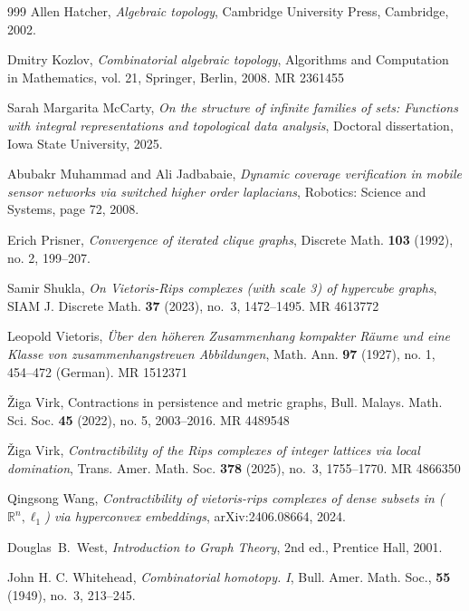 \documentclass{amsart}
\theoremstyle{definition}
\theoremstyle{remark}
\numberwithin{equation}{section}
\begin{document}
{\begin{thebibliography}{999}
Allen Hatcher, {\em Algebraic topology}, Cambridge University Press, Cambridge, 2002.


Dmitry Kozlov, {\em Combinatorial algebraic topology}, Algorithms and Computation in Mathematics, vol. 21, Springer, Berlin, 2008. MR 2361455

Sarah Margarita McCarty, {\em On the structure of infinite families of sets: Functions with integral representations and topological data analysis}, Doctoral dissertation, Iowa State
University, 2025.






Abubakr Muhammad and Ali Jadbabaie, {\em Dynamic coverage verification in mobile sensor networks via switched higher order laplacians}, Robotics: Science and Systems,
page 72, 2008.



Erich Prisner, {\em Convergence of iterated clique graphs}, Discrete Math. {\bf 103} (1992), no. 2, 199--207.




Samir Shukla, {\em On Vietoris-Rips complexes (with scale 3) of hypercube graphs}, SIAM J. Discrete Math. {\bf 37} (2023), no.~3, 1472--1495. MR 4613772

Leopold Vietoris, {\em Über den höheren Zusammenhang kompakter Räume und eine Klasse von zusammenhangstreuen Abbildungen}, Math. Ann. {\bf 97} (1927), no. 1, 454--472 (German). MR 1512371

Žiga Virk, Contractions in persistence and metric graphs, Bull. Malays. Math. Sci. Soc. {\bf 45} (2022), no. 5, 2003--2016. MR 4489548

Žiga Virk, {\em Contractibility of the Rips complexes of integer lattices via local domination}, Trans. Amer. Math. Soc. {\bf 378} (2025), no.~3, 1755--1770. MR 4866350



Qingsong Wang, {\em Contractibility of vietoris-rips complexes of dense subsets in ($\mathbb{R}^n, \ell_1$) via hyperconvex embeddings}, arXiv:2406.08664, 2024.

Douglas~B.~West, \emph{Introduction to Graph Theory}, 2nd ed., Prentice Hall, 2001.


John H. C. Whitehead, {\em Combinatorial homotopy. I}, Bull. Amer. Math. Soc.,  {\bf 55} (1949), no.~3, 213--245.


\end{thebibliography}}
\end{document}
